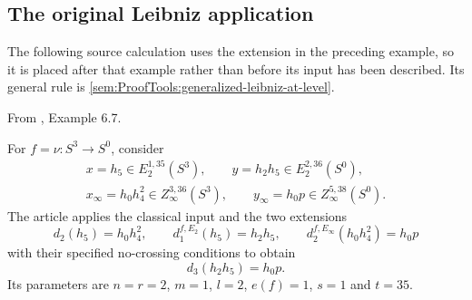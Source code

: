 \subsection{The original Leibniz application}

The following source calculation uses the extension in the preceding
example, so it is placed after that example rather than before its
input has been described. Its general rule is
\ref{sem:ProofTools:generalized-leibniz-at-level}.

\begin{proposition}
\label{paper:6.7}
\label{exam:Leibnizyes}
From \cite{LWX126}, Example 6.7.\par
For $f=\nu:S^3\to S^0$, consider
\[
\begin{gathered}
x=h_5\in E_2^{1,35}(S^3),\qquad
y=h_2h_5\in E_2^{2,36}(S^0),\\
x_\infty=h_0h_4^2\in Z_\infty^{3,36}(S^3),\qquad
y_\infty=h_0p\in Z_\infty^{5,38}(S^0).
\end{gathered}
\]
The article applies the classical input and the two extensions
\[
d_2(h_5)=h_0h_4^2,\qquad
d_1^{f,E_2}(h_5)=h_2h_5,\qquad
d_2^{f,E_\infty}(h_0h_4^2)=h_0p
\]
with their specified no-crossing conditions to obtain
\[
d_3(h_2h_5)=h_0p.
\]
Its parameters are $n=r=2$, $m=1$, $l=2$, $e(f)=1$, $s=1$ and $t=35$.
\end{proposition}

